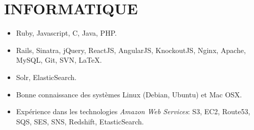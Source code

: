 \section{INFORMATIQUE}

\vspace{0.75cm}

\begin{itemize}
  \item Ruby, Javascript, C, Java, PHP.
  \item Rails, Sinatra, jQuery, ReactJS, AngularJS, KnockoutJS, Nginx, Apache, MySQL, Git, SVN, \LaTeX.
  \item Solr, ElasticSearch.
  \item Bonne connaissance des systèmes Linux (Debian, Ubuntu) et Mac OSX.
  \item Expérience dans les technologies \emph{Amazon Web Services}: S3, EC2, Route53, SQS, SES, SNS, Redshift, EtasticSearch.
\end{itemize}
